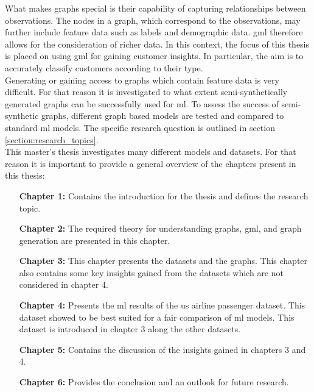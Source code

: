 	\noindent What makes graphs special is their capability of capturing
	relationships between observations. The nodes in a graph, which correspond
	to the observations, may further include feature data such as labels and
	demographic data. \acs{gml} therefore allows for the
	consideration of richer data. In this context, the focus of this thesis is 
	placed on using \acs{gml} for gaining customer insights. In
	particular, the aim is to accurately classify customers according to their
	type. \\

	\noindent Generating or gaining access to graphs which contain feature data 
	is very difficult. For that reason it is investigated to what extent
	semi-synthetically generated graphs can be successfully used for \ac{ml}. 
	To assess the success of semi-synthetic graphs, different graph based models 
	are tested and compared to standard \acs{ml} models. The specific 
	research question is outlined in section \ref{section:research_topics}. \\

	\noindent This master's thesis investigates many different models and
	datasets. For that reason it is important to provide a general overview of
	the chapters present in this thesis:

	\begin{itemize}[leftmargin=1.0in] 
		\item[\textbf{Chapter 1:}] Contains the introduction for the thesis and 
			defines the research topic.
		\item[\textbf{Chapter 2:}] The required theory for understanding
			graphs, \acs{gml}, and graph generation are presented in this 
			chapter.
		\item[\textbf{Chapter 3:}] This chapter presents the datasets and the 
			graphs. This chapter also contains some key insights gained from the 
			datasets which are not considered in chapter 4.
		\item[\textbf{Chapter 4:}] Presents the \acs{ml} results of the
			\acs{us} airline passenger dataset. This dataset showed to be best 
			suited for a fair comparison of \acs{ml} models. This dataset is 
			introduced in chapter 3 along the other datasets.
		\item[\textbf{Chapter 5:}]  Contains the discussion of the insights 
			gained in chapters 3 and 4.
		\item[\textbf{Chapter 6:}] Provides the conclusion and an outlook for 
			future research.
	\end{itemize}

